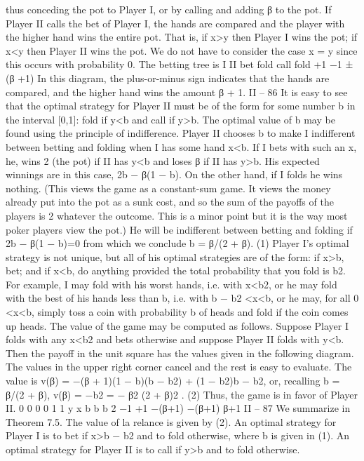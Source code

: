 thus conceding the pot to Player I, or by calling and adding β to the pot. If Player II calls
the bet of Player I, the hands are compared and the player with the higher hand wins the
entire pot. That is, if x>y then Player I wins the pot; if x<y then Player II wins the
pot. We do not have to consider the case x = y since this occurs with probability 0.
The betting tree is
I
II
bet fold
call fold
+1
−1
±(β +1)
In this diagram, the plus-or-minus sign indicates that the hands are compared, and
the higher hand wins the amount β + 1.
II – 86
It is easy to see that the optimal strategy for Player II must be of the form for some
number b in the interval [0,1]: fold if y<b and call if y>b. The optimal value of b may be
found using the principle of indifference. Player II chooses b to make I indifferent between
betting and folding when I has some hand x<b. If I bets with such an x, he, wins 2 (the
pot) if II has y<b and loses β if II has y>b. His expected winnings are in this case,
2b − β(1 − b). On the other hand, if I folds he wins nothing. (This views the game as a
constant-sum game. It views the money already put into the pot as a sunk cost, and so
the sum of the payoffs of the players is 2 whatever the outcome. This is a minor point but
it is the way most poker players view the pot.) He will be indifferent between betting and
folding if
2b − β(1 − b)=0
from which we conclude
b = β/(2 + β). (1)
Player I’s optimal strategy is not unique, but all of his optimal strategies are of the
form: if x>b, bet; and if x<b, do anything provided the total probability that you fold
is b2. For example, I may fold with his worst hands, i.e. with x<b2, or he may fold with
the best of his hands less than b, i.e. with b − b2 <x<b, or he may, for all 0 <x<b,
simply toss a coin with probability b of heads and fold if the coin comes up heads.
The value of the game may be computed as follows. Suppose Player I folds with any
x<b2 and bets otherwise and suppose Player II folds with y<b. Then the payoff in the
unit square has the values given in the following diagram. The values in the upper right
corner cancel and the rest is easy to evaluate. The value is v(β) = −(β + 1)(1 − b)(b −
b2) + (1 − b2)b − b2, or, recalling b = β/(2 + β),
v(β) = −b2 = − β2
(2 + β)2 . (2)
Thus, the game is in favor of Player II.
0
0
0
0
1
1
y
x
b
b b 2
−1
+1
−(β+1)
−(β+1)
β+1
II – 87
We summarize in
Theorem 7.5. The value of la relance is given by (2). An optimal strategy for Player I
is to bet if x>b − b2 and to fold otherwise, where b is given in (1). An optimal strategy
for Player II is to call if y>b and to fold otherwise.
